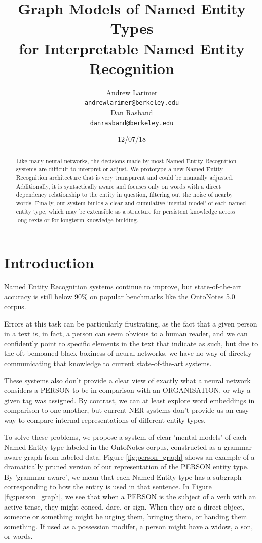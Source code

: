 \documentclass[11pt,a4paper]{article}
\title{Graph Models of Named Entity Types\\for Interpretable Named Entity Recognition}
\author{Andrew Larimer \\
  {\tt andrewlarimer@berkeley.edu} \\\And
  Dan Rasband \\
  {\tt danrasband@berkeley.edu} \\}
\date{12/07/18}
\begin{document}
\maketitle
\begin{abstract}
Like many neural networks, the decisions made by most Named Entity Recognition systems are difficult to interpret or adjust. We prototype a new Named Entity Recognition architecture that is very transparent and could be manually adjusted. Additionally, it is syntactically aware and focuses only on words with a direct dependency relationship to the entity in question, filtering out the noise of nearby words. Finally, our system builds a clear and cumulative 'mental model' of each named entity type, which may be extensible as a structure for persistent knowledge across long texts or for longterm knowledge-building.
\end{abstract}

\section{Introduction}

Named Entity Recognition systems continue to improve, but state-of-the-art accuracy is still below 90\% on popular benchmarks like the OntoNotes 5.0 corpus.

Errors at this task can be particularly frustrating, as the fact that a given person in a text is, in fact, a person can seem obvious to a human reader, and we can confidently point to specific elements in the text that indicate as such, but due to the oft-bemoaned black-boxiness of neural networks, we have no way of directly communicating that knowledge to current state-of-the-art systems.

These systems also don't provide a clear view of exactly what a neural network considers a PERSON to be in comparison with an ORGANISATION, or why a given tag was assigned. By contrast, we can at least explore word embeddings in comparison to one another, but current NER systems don't provide us an easy way to compare internal representations of different entity types.

To solve these problems, we propose a system of clear 'mental models' of each Named Entity type labeled in the OntoNotes corpus, constructed as a grammar-aware graph from labeled data. Figure \ref{fig:person_graph} shows an example of a dramatically pruned version of our representation of the PERSON entity type. By 'grammar-aware', we mean that each Named Entity type has a subgraph corresponding to how the entity is used in that sentence. In Figure  \ref{fig:person_graph}, we see that when a PERSON is the subject of a verb with an active tense, they might conced, dare, or sign. When they are a direct object, someone or something might be urging them, bringing them, or handing them something. If used as a possession modifer, a person might have a widow, a son, or words.
\end{document}
